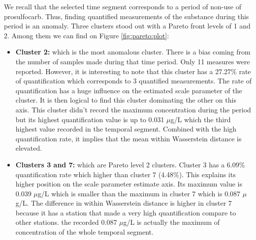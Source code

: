 We recall that the selected time segment corresponds to a period of non-use of prosulfocarb. Thus, finding quantified measurements of the substance during this period is an anomaly. Three clusters stood out with a Pareto front levels of 1 and 2. Among them we can find on Figure \ref{fig:pareto:plot}: 
\begin{itemize}
    \item \textbf{Cluster 2:} which is the most anomalous cluster. There is a bias coming from the number of samples made during that time period. Only 11 measures were reported. However, it is interesting to note that this cluster has a 27.27$\%$ rate of quantification which corresponds to 3 quantified measurements. The rate of quantification has a huge influence on the estimated scale parameter of the cluster. It is then logical to find this cluster dominating the other on this axis. This cluster didn't record the maximum concentration during the period but its highest quantification value is up to 0.031 $\mu$g/L which the third highest value recorded in the temporal segment. Combined with the high quantification rate, it implies that the mean within Wasserstein distance is elevated.  
    \item \textbf{Clusters 3 and 7:} which are Pareto level 2 clusters. Cluster 3 has a 6.09$\%$ quantification rate which higher than cluster 7 (4.48$\%$). This explains its higher position on the scale parameter estimate axis. Its maximum value is 0.039 $\mu$g/L which is smaller than the maximum in cluster 7 which is 0.087 $\mu$g/L. The difference in within Wasserstein distance is higher in cluster 7 because it has a station that made a very high quantification compare to other stations. the recorded 0.087 $\mu$g/L is actually the maximum of concentration of the whole temporal segment.
\end{itemize}

